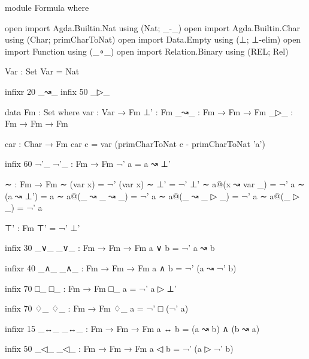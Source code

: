 \begin{spverbatim}
module Formula where

open import Agda.Builtin.Nat using (Nat; _-_)
open import Agda.Builtin.Char using (Char; primCharToNat)
open import Data.Empty using (⊥; ⊥-elim)
open import Function using (_∘_)
open import Relation.Binary using (REL; Rel)

Var : Set
Var = Nat

infixr 20 _↝_
infix 50 _▷_


data Fm : Set where
  var : Var → Fm
  ⊥' : Fm
  _↝_ : Fm → Fm → Fm
  _▷_ : Fm → Fm → Fm

car : Char → Fm
car c = var (primCharToNat c - primCharToNat 'a')

infix 60 ¬'_
¬'_ : Fm → Fm
¬' a = a ↝ ⊥'

∼ : Fm → Fm
∼ (var x) = ¬' (var x)
∼ ⊥' = ¬' ⊥'
∼ a@(x ↝ var _) = ¬' a
∼ (a ↝ ⊥') = a
∼ a@(_ ↝ _ ↝ _) = ¬' a
∼ a@(_ ↝ _ ▷ _) = ¬' a
∼ a@(_ ▷ _) = ¬' a

⊤' : Fm
⊤' = ¬' ⊥'

infix 30 _∨_
_∨_ : Fm → Fm → Fm
a ∨ b = ¬' a ↝ b

infixr 40 _∧_
_∧_ : Fm → Fm → Fm
a ∧ b = ¬' (a ↝ ¬' b)

infix 70 □_
□_ : Fm → Fm
□_ a = ¬' a ▷ ⊥'

infix 70 ♢_
♢_ : Fm → Fm
♢_ a = ¬' □ (¬' a)

infixr 15 _↔_
_↔_ : Fm → Fm → Fm
a ↔ b = (a ↝ b) ∧ (b ↝ a)

infix 50 _◁_
_◁_ : Fm → Fm → Fm
a ◁ b = ¬' (a ▷ ¬' b)
\end{spverbatim}
